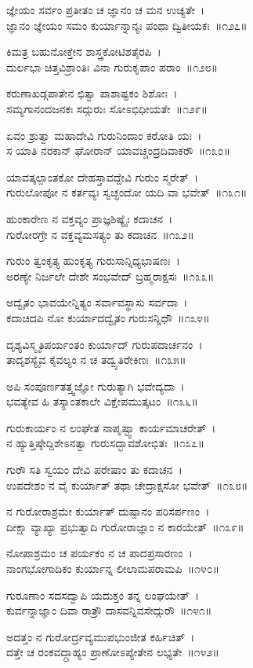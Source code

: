 ಜ್ಞೇಯಂ ಸರ್ವಂ ಪ್ರತೀತಂ ಚ ಜ್ಞಾನಂ ಚ ಮನ ಉಚ್ಯತೇ~।\\
ಜ್ಞಾನಂ ಜ್ಞೇಯಂ ಸಮಂ ಕುರ್ಯಾನ್ನಾನ್ಯಃ ಪಂಥಾ ದ್ವಿತೀಯಕಃ~॥೧೨೭॥

ಕಿಮತ್ರ ಬಹುನೋಕ್ತೇನ ಶಾಸ್ತ್ರಕೋಟಿಶತೈರಪಿ~।\\
ದುರ್ಲಭಾ ಚಿತ್ತವಿಶ್ರಾಂತಿಃ ವಿನಾ ಗುರುಕೃಪಾಂ ಪರಾಂ~॥೧೨೮॥

ಕರುಣಾಖಡ್ಗಪಾತೇನ ಛಿತ್ವಾ ಪಾಶಾಷ್ಟಕಂ ಶಿಶೋಃ~।\\
ಸಮ್ಯಗಾನಂದಜನಕಃ ಸದ್ಗುರುಃ ಸೋಽಭಿಧೀಯತೇ~॥೧೨೯॥

ಏವಂ ಶ್ರುತ್ವಾ ಮಹಾದೇವಿ ಗುರುನಿಂದಾಂ ಕರೋತಿ ಯಃ~।\\
ಸ ಯಾತಿ ನರಕಾನ್ ಘೋರಾನ್ ಯಾವಚ್ಚಂದ್ರದಿವಾಕರೌ~॥೧೩೦॥

ಯಾವತ್ಕಲ್ಪಾಂತಕೋ ದೇಹಸ್ತಾವದ್ದೇವಿ ಗುರುಂ ಸ್ಮರೇತ್~।\\
ಗುರುಲೋಪೋ ನ ಕರ್ತವ್ಯಃ ಸ್ವಚ್ಛಂದೋ ಯದಿ ವಾ ಭವೇತ್~॥೧೩೧॥

ಹುಂಕಾರೇಣ ನ ವಕ್ತವ್ಯಂ ಪ್ರಾಜ್ಞಶಿಷ್ಯೈಃ ಕದಾಚನ~।\\
ಗುರೋರಗ್ರೇ ನ ವಕ್ತವ್ಯಮಸತ್ಯಂ ತು ಕದಾಚನ~॥೧೩೨॥

ಗುರುಂ ತ್ವಂಕೃತ್ಯ ಹುಂಕೃತ್ಯ ಗುರುಸಾನ್ನಿಧ್ಯಭಾಷಣಃ~।\\
ಅರಣ್ಯೇ ನಿರ್ಜಲೇ ದೇಶೇ ಸಂಭವೇದ್ ಬ್ರಹ್ಮರಾಕ್ಷಸಃ~॥೧೩೩॥

ಅದ್ವೈತಂ ಭಾವಯೇನ್ನಿತ್ಯಂ ಸರ್ವಾವಸ್ಥಾಸು ಸರ್ವದಾ~।\\
ಕದಾಚಿದಪಿ ನೋ ಕುರ್ಯಾದದ್ವೈತಂ ಗುರುಸನ್ನಿಧೌ~॥೧೩೪॥

ದೃಶ್ಯವಿಸ್ಮೃತಿಪರ್ಯಂತಂ ಕುರ್ಯಾದ್ ಗುರುಪದಾರ್ಚನಂ~।\\
ತಾದೃಶಸ್ಯೈವ ಕೈವಲ್ಯಂ ನ ಚ ತದ್ವ್ಯತಿರೇಕಿಣಃ~॥೧೩೫॥

ಅಪಿ ಸಂಪೂರ್ಣತತ್ತ್ವಜ್ಞೋ ಗುರುತ್ಯಾಗಿ ಭವೇದ್ಯದಾ~।\\
ಭವತ್ಯೇವ ಹಿ ತಸ್ಯಾಂತಕಾಲೇ ವಿಕ್ಷೇಪಮುತ್ಕಟಂ~॥೧೩೬॥

ಗುರುಕಾರ್ಯಂ ನ ಲಂಘೇತ ನಾಪೃಷ್ಟ್ವಾ ಕಾರ್ಯಮಾಚರೇತ್~।\\
ನ ಹ್ಯುತ್ತಿಷ್ಠೇದ್ದಿಶೇಽನತ್ವಾ ಗುರುಸದ್ಭಾವಶೋಭಿತಃ~॥೧೩೭॥

ಗುರೌ ಸತಿ ಸ್ವಯಂ ದೇವಿ ಪರೇಷಾಂ ತು ಕದಾಚನ~।\\
ಉಪದೇಶಂ ನ ವೈ ಕುರ್ಯಾತ್ ತಥಾ ಚೇದ್ರಾಕ್ಷಸೋ ಭವೇತ್~॥೧೩೮॥

ನ ಗುರೋರಾಶ್ರಮೇ ಕುರ್ಯಾತ್ ದುಷ್ಪಾನಂ ಪರಿಸರ್ಪಣಂ~।\\
ದೀಕ್ಷಾ ವ್ಯಾಖ್ಯಾ ಪ್ರಭುತ್ವಾದಿ ಗುರೋರಾಜ್ಞಾಂ ನ ಕಾರಯೇತ್~॥೧೩೯॥

ನೋಪಾಶ್ರಮಂ ಚ ಪರ್ಯಕಂ ನ ಚ ಪಾದಪ್ರಸಾರಣಂ~।\\
ನಾಂಗಭೋಗಾದಿಕಂ ಕುರ್ಯಾನ್ನ ಲೀಲಾಮಪರಾಮಪಿ~॥೧೪೦॥

ಗುರೂಣಾಂ ಸದಸದ್ವಾಪಿ ಯದುಕ್ತಂ ತನ್ನ ಲಂಘಯೇತ್~।\\
ಕುರ್ವನ್ನಾಜ್ಞಾಂ ದಿವಾ ರಾತ್ರೌ ದಾಸವನ್ನಿವಸೇದ್ಗುರೌ~॥೧೪೧॥

ಅದತ್ತಂ ನ ಗುರೋರ್ದ್ರವ್ಯಮುಪಭುಂಜೀತ ಕರ್ಹಿಚಿತ್~।\\
ದತ್ತೇ ಚ ರಂಕವದ್ಗ್ರಾಹ್ಯಂ ಪ್ರಾಣೋಽಪ್ಯೇತೇನ ಲಭ್ಯತೇ~॥೧೪೨॥

